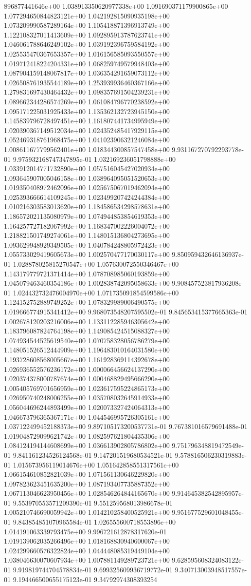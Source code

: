 896877441646e+00	1.038913350620977338e+00	1.091690371179900865e+00	1.077294650844823121e+00	1.042192815090935198e+00	1.073209990587289164e+00	1.105418871396913749e+00	1.122108327011413609e+00	1.092895913787623741e+00	1.046061788646249102e+00	1.039192396759584192e+00	1.025535470367653357e+00	1.016156585093550557e+00	1.019712418224204331e+00	1.068259749579948403e+00	1.087904159148067817e+00	1.036354291659073112e+00	1.026508761935544189e+00	1.253939936460367166e+00	1.279831697430464432e+00	1.098357691504239231e+00	1.089662344286574269e+00	1.061084796770238592e+00	1.095171225031925433e+00	1.135362132723945150e+00	1.145839796728497451e+00	1.161807441734995949e+00	1.020390367149512034e+00	1.024352485417929115e+00	1.052469318761968475e+00	1.041023906321246084e+00	1.008611677799562401e+00	1.018344300857547458e+00	9.931167270792293778e-01	9.975932168747347895e-01	1.032169236051798888e+00	1.033912014771732890e+00	1.057516045427020934e+00	1.093645907005046158e+00	1.038964095051520653e+00	1.019350408972462096e+00	1.025675067019462094e+00	1.025393666614109245e+00	1.023499207424244384e+00	1.010216303583013620e+00	1.184586534298578631e+00	1.186572021135080979e+00	1.074944853854619353e+00	1.164257727182067992e+00	1.168347002226004072e+00	1.218821501749274061e+00	1.148015136804273695e+00	1.093629948929349505e+00	1.040784248805972423e+00	1.055733029419605673e+00	1.002570477170030117e+00	9.850959432646136937e-01	1.028878025815270547e+00	1.057630072550346467e+00	1.143179779721371414e+00	1.078708985060193859e+00	1.045079463460354186e+00	1.002838742095058633e+00	9.908457523817936208e-01	1.024432732476004970e+00	1.071735091854599586e+00	1.124152752889749252e+00	1.078329989006490575e+00	1.019666774915341412e+00	9.968073548207595502e-01	9.845653415377665363e-01	1.002678120203216006e+00	1.133112285946305642e+00	1.183796087824764198e+00	1.149085424515088327e+00	1.074934544525619540e+00	1.070758328056786279e+00	1.148051526512444909e+00	1.196483010164031580e+00	1.193728608568005667e+00	1.161928369114392678e+00	1.026936552576236172e+00	1.000066456624137290e+00	1.020374378000787674e+00	1.000468829495666290e+00	1.005405769701656959e+00	1.023617595224865173e+00	1.026950740248006255e+00	1.035708032645914933e+00	1.056044696244893499e+00	1.020073327424064313e+00	1.046673796365367171e+00	1.044546995726305161e+00	1.037122499452188373e+00	9.897105173200537731e-01	9.767381016579691488e-01	1.019048729099621742e+00	1.082597621804435306e+00	1.084124194144608699e+00	1.036613902805786802e+00	9.751796348819472549e-01	9.841161234526124568e-01	9.147201519680534521e-01	9.578816506230319883e-01	1.015673956119014676e+00	1.051642858551317561e+00	1.066154610852821039e+00	1.071561130646229820e+00	1.097823623451635200e+00	1.087193407735887352e+00	1.067113046623950456e+00	1.028546264844165670e+00	9.914645382542895957e-01	9.553970553571209390e-01	9.551259568013986678e-01	1.005210746690059942e+00	1.014210258400525921e+00	9.951677529601048455e-01	9.843854851070965584e-01	1.026555600718553896e+00	1.014191063339793475e+00	9.996721612878317620e-01	1.019139062035266496e+00	1.018168830940600067e+00	1.024299660576322824e+00	1.044448085319449104e+00	1.038046630070607934e+00	1.007881149289723721e+00	9.628595608324083122e-01	9.919819744704578834e-01	9.699325609936719772e-01	9.340713003948517557e-01	9.194466500655175123e-01	9.34792974308393254